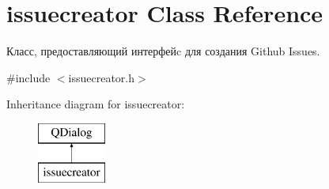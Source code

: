 \section{issuecreator Class Reference}
\label{classissuecreator}


Класс, предоставляющий интерфейc для создания Github Issues.  




{\ttfamily \#include $<$issuecreator.\+h$>$}

Inheritance diagram for issuecreator\+:\begin{figure}[H]
\begin{center}
\leavevmode
\includegraphics[height=2.000000cm]{classissuecreator}
\end{center}
\end{figure}
